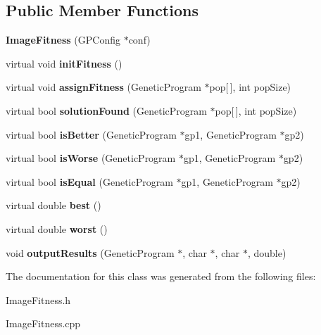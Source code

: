 \subsection*{Public Member Functions}
\begin{DoxyCompactItemize}
\item 
\hypertarget{class_image_fitness_abe7707371984af9215fcd812b51defef}{{\bfseries Image\-Fitness} (G\-P\-Config $\ast$conf)}\label{class_image_fitness_abe7707371984af9215fcd812b51defef}

\item 
\hypertarget{class_image_fitness_a87b7ded1718e3a5ddf41855e18c060d3}{virtual void {\bfseries init\-Fitness} ()}\label{class_image_fitness_a87b7ded1718e3a5ddf41855e18c060d3}

\item 
\hypertarget{class_image_fitness_ab7a09b58e0f1aa28eb54e92b1c7c1e39}{virtual void {\bfseries assign\-Fitness} (Genetic\-Program $\ast$pop\mbox{[}$\,$\mbox{]}, int pop\-Size)}\label{class_image_fitness_ab7a09b58e0f1aa28eb54e92b1c7c1e39}

\item 
\hypertarget{class_image_fitness_a20dad1b0e981f8d0e6f968982566b073}{virtual bool {\bfseries solution\-Found} (Genetic\-Program $\ast$pop\mbox{[}$\,$\mbox{]}, int pop\-Size)}\label{class_image_fitness_a20dad1b0e981f8d0e6f968982566b073}

\item 
\hypertarget{class_image_fitness_a8b981e2d67357f1316bce965da2cb511}{virtual bool {\bfseries is\-Better} (Genetic\-Program $\ast$gp1, Genetic\-Program $\ast$gp2)}\label{class_image_fitness_a8b981e2d67357f1316bce965da2cb511}

\item 
\hypertarget{class_image_fitness_ad140d00e2dd89edc72ebceadf8aaee00}{virtual bool {\bfseries is\-Worse} (Genetic\-Program $\ast$gp1, Genetic\-Program $\ast$gp2)}\label{class_image_fitness_ad140d00e2dd89edc72ebceadf8aaee00}

\item 
\hypertarget{class_image_fitness_a49732d7c1838113c37dae1bf102643e9}{virtual bool {\bfseries is\-Equal} (Genetic\-Program $\ast$gp1, Genetic\-Program $\ast$gp2)}\label{class_image_fitness_a49732d7c1838113c37dae1bf102643e9}

\item 
\hypertarget{class_image_fitness_a7906f6594096f7ebaf5e64bcfb56a657}{virtual double {\bfseries best} ()}\label{class_image_fitness_a7906f6594096f7ebaf5e64bcfb56a657}

\item 
\hypertarget{class_image_fitness_a58acec0b8d5e84da69221aab18308c47}{virtual double {\bfseries worst} ()}\label{class_image_fitness_a58acec0b8d5e84da69221aab18308c47}

\item 
\hypertarget{class_image_fitness_a3834397e9a1486dc37b2e4eb133bc84f}{void {\bfseries output\-Results} (Genetic\-Program $\ast$, char $\ast$, char $\ast$, double)}\label{class_image_fitness_a3834397e9a1486dc37b2e4eb133bc84f}

\end{DoxyCompactItemize}


The documentation for this class was generated from the following files\-:\begin{DoxyCompactItemize}
\item 
Image\-Fitness.\-h\item 
Image\-Fitness.\-cpp\end{DoxyCompactItemize}
